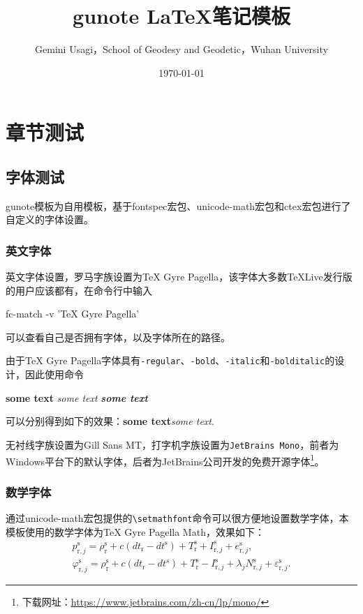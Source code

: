 \documentclass{gunote}
\title{gunote \LaTeX{}笔记模板}
\author{Gemini Usagi，School of Geodesy and Geodetic，Wuhan University}
\date{\today}
\newcommand{\cmd}[1]{\texttt{\backslash #1}}
\begin{document}
\maketitle
\tableofcontents
\thispagestyle{empty}
\clearpage
{}
\chapter{章节测试}
\section{字体测试}
\textsf{gunote}模板为自用模板，基于\textsf{fontspec}宏包、\textsf{unicode-math}宏包和\textsf{ctex}宏包进行了自定义的字体设置。
\subsection{英文字体}
英文字体设置，罗马字族设置为TeX Gyre Pagella，该字体大多数\TeX{}Live发行版的用户应该都有，在命令行中输入
\begin{Code*}[text]
fc-match -v 'TeX Gyre Pagella'
\end{Code*}
可以查看自己是否拥有字体，以及字体所在的路径。
\begin{Code*}[latex]
\setmainfont{TeX Gyre Pagella}
\end{Code*}
由于TeX Gyre Pagella字体具有\texttt{-regular}、\texttt{-bold}、\texttt{-italic}和\texttt{-bolditalic}的设计，因此使用命令
\begin{Code*}[latex]
\textbf{some text}
\textit{some text}
{\bfseries\itshape some text}
\end{Code*}
可以分别得到如下的效果：\textbf{some text}\quad\textit{some text}.

无衬线字族设置为\textsf{Gill Sans MT}，打字机字族设置为\texttt{JetBrains Mono}，前者为Windows平台下的默认字体，后者为JetBrains公司开发的免费开源字体\footnote{下载网址：\url{https://www.jetbrains.com/zh-cn/lp/mono/}}。
\subsection{数学字体}
通过\textsf{unicode-math}宏包提供的\cmd{setmathfont}命令可以很方便地设置数学字体，本模板使用的数学字体为TeX Gyre Pagella Math，效果如下：
{
\def\rcv{\mathrm{r}}
\def\sat{\mathrm{s}}
\begin{gather}
  p_{\rcv,j}^\sat=\rho_\rcv^\sat+c(dt_\rcv-dt^\sat)+T_\rcv^\sat+I_{\rcv,j}^\sat+e_{\rcv,j}^\sat,\\
  \varphi_{\rcv,j}^\sat=\rho_\rcv^\sat+c(dt_\rcv-dt^\sat)+T_\rcv^\sat-I_{\rcv,j}^\sat+\lambda_j N_{\rcv,j}^\sat+\varepsilon_{\rcv,j}^\sat.
\end{gather}
}
\end{document}
